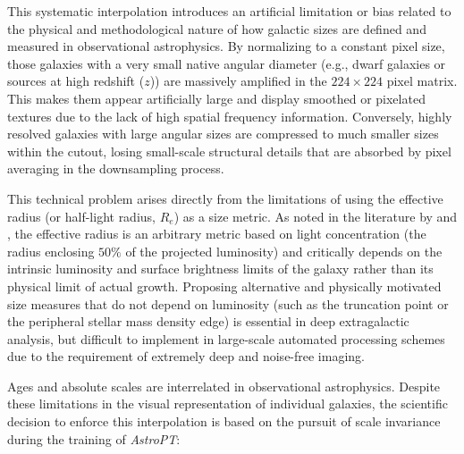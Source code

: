This systematic interpolation introduces an artificial limitation or bias related to the physical and methodological nature of how galactic sizes are defined and measured in observational astrophysics. By normalizing to a constant pixel size, those galaxies with a very small native angular diameter (e.g., dwarf galaxies or sources at high redshift ($z$)) are massively amplified in the $224 \times 224$ pixel matrix. This makes them appear artificially large and display smoothed or pixelated textures due to the lack of high spatial frequency information. Conversely, highly resolved galaxies with large angular sizes are compressed to much smaller sizes within the cutout, losing small-scale structural details that are absorbed by pixel averaging in the downsampling process.

This technical problem arises directly from the limitations of using the effective radius (or half-light radius, $R_e$) as a size metric. As noted in the literature by \textcite{ar:trujillo-2020} and \textcite{ar:buitrago-2024}, the effective radius is an arbitrary metric based on light concentration (the radius enclosing $50\%$ of the projected luminosity) and critically depends on the intrinsic luminosity and surface brightness limits of the galaxy rather than its physical limit of actual growth. Proposing alternative and physically motivated size measures that do not depend on luminosity (such as the truncation point or the peripheral stellar mass density edge) is essential in deep extragalactic analysis, but difficult to implement in large-scale automated processing schemes due to the requirement of extremely deep and noise-free imaging.

Ages and absolute scales are interrelated in observational astrophysics. Despite these limitations in the visual representation of individual galaxies, the scientific decision to enforce this interpolation is based on the pursuit of scale invariance during the training of \textit{AstroPT}:

